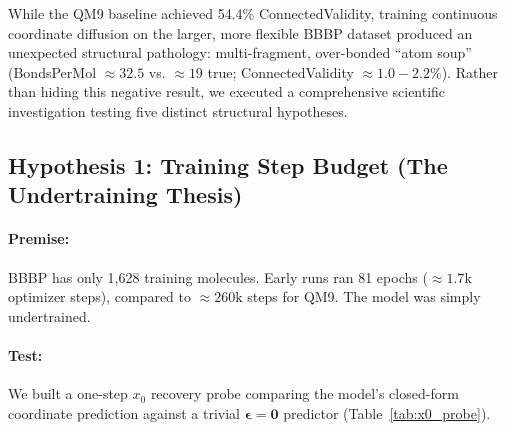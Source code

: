 \documentclass[12pt, a4paper]{article}
\begin{document}
While the QM9 baseline achieved 54.4\% ConnectedValidity, training continuous coordinate diffusion on the larger, more flexible BBBP dataset produced an unexpected structural pathology: multi-fragment, over-bonded ``atom soup'' (BondsPerMol $\approx 32.5$ vs. $\approx 19$ true; ConnectedValidity $\approx 1.0-2.2\%$). Rather than hiding this negative result, we executed a comprehensive scientific investigation testing five distinct structural hypotheses.

\subsection{Hypothesis 1: Training Step Budget (The Undertraining Thesis)}
\paragraph{Premise:} BBBP has only 1,628 training molecules. Early runs ran 81 epochs ($\approx 1.7\text{k}$ optimizer steps), compared to $\approx 260\text{k}$ steps for QM9. The model was simply undertrained.
\paragraph{Test:} We built a one-step $x_0$ recovery probe comparing the model's closed-form coordinate prediction against a trivial $\boldsymbol{\epsilon}=\mathbf{0}$ predictor (Table~\ref{tab:x0_probe}).

\begin{table}[H]
\centering
\small
\caption{One-Step $x_0$ Prediction Error Across Training Milestones vs. Trivial Predictor.}
\label{tab:x0_probe}
\end{table}
\end{document}
